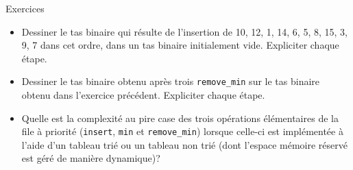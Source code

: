 \documentclass[handout]{beamer}
\begin{document}
\begin{frame}[t]{Exercices}
\begin{itemize}
	\item Dessiner le tas binaire qui résulte de l'insertion de 10, 12, 1, 14, 6, 5, 8, 15, 3, 9, 7 dans cet ordre, dans un tas binaire initialement vide. Expliciter chaque étape.
	\item Dessiner le tas binaire obtenu après trois \lstinline{remove_min} sur le tas binaire obtenu dans l'exercice précédent. Expliciter chaque étape.
	\item Quelle est la complexité au pire case des trois opérations élémentaires de la file à priorité (\lstinline{insert}, \lstinline{min} et \lstinline{remove_min}) lorsque celle-ci est implémentée à l'aide d'un tableau trié ou un tableau non trié (dont l'espace mémoire réservé est géré de manière dynamique)?
\end{itemize}
\end{frame}
\end{document}
